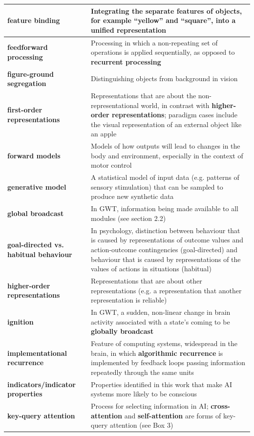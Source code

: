 \documentclass[12pt]{article}
\begin{document}
\begin{longtable}{|>{\raggedright\arraybackslash}p{}|>{\raggedright\arraybackslash}p{}|}
\hline
\textbf{feature binding} & Integrating the separate features of objects, for example ``yellow'' and ``square'', into a unified representation \\
\hline
\textbf{feedforward processing} & Processing in which a non-repeating set of operations is applied sequentially, as opposed to \textbf{recurrent processing} \\
\hline
\textbf{figure-ground segregation} & Distinguishing objects from background in vision \\
\hline
\textbf{first-order representations} & Representations that are about the non-representational world, in contrast with \textbf{higher-order representations}; paradigm cases include the visual representation of an external object like an apple \\
\hline
\textbf{forward models} & Models of how outputs will lead to changes in the body and environment, especially in the context of motor control \\
\hline
\textbf{generative model} & A statistical model of input data (e.g. patterns of sensory stimulation) that can be sampled to produce new synthetic data \\
\hline
\textbf{global broadcast} & In GWT, information being made available to all modules (see section 2.2) \\
\hline
\textbf{goal-directed vs. habitual behaviour} & In psychology, distinction between behaviour that is caused by representations of outcome values and action-outcome contingencies (goal-directed) and behaviour that is caused by representations of the values of actions in situations (habitual) \\
\hline
\textbf{higher-order representations} & Representations that are about other representations (e.g. a representation that another representation is reliable) \\
\hline
\textbf{ignition} & In GWT, a sudden, non-linear change in brain activity associated with a state's coming to be \textbf{globally broadcast} \\
\hline
\textbf{implementational recurrence} & Feature of computing systems, widespread in the brain, in which \textbf{algorithmic recurrence} is implemented by feedback loops passing information repeatedly through the same units \\
\hline
\textbf{indicators/indicator properties} & Properties identified in this work that make AI systems more likely to be conscious \\
\hline
\textbf{key-query attention} & Process for selecting information in AI; \textbf{cross-attention} and \textbf{self-attention} are forms of key-query attention (see Box 3) \\

\end{longtable}
\end{document}
